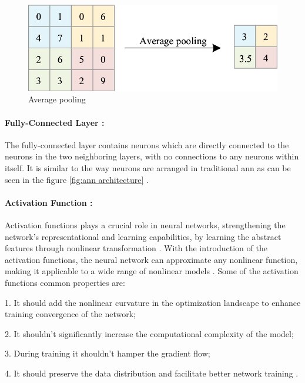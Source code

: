 \begin{figure}[H]
    \centering
    \includegraphics[width=1\linewidth]{Rohit_Master_Thesis//Images/average_pooling.png}
    \caption{Average pooling \cite{Zhao2024}}
    \label{fig:average pooling}
\end{figure}

\paragraph*{Fully-Connected Layer :}

The fully-connected layer contains neurons which are directly connected to the neurons in the two neighboring layers, with no connections to any neurons within itself. It is similar to the way neurons are arranged in traditional \gls{ann} as can be seen in the figure \ref{fig:ann architecture} \cite{oshea2015introductionconvolutionalneuralnetworks}.

\paragraph*{Activation Function :}

Activation functions plays a crucial role in neural networks, strengthening the network's representational and learning capabilities, by learning the abstract features through nonlinear transformation \cite{dubey2022activationfunctionsdeeplearning}. With the introduction of the activation functions, the neural network can approximate any nonlinear function, making it applicable to a wide range of nonlinear models \cite{Zhao2024}. Some of the activation functions common properties are:

1. It should add the nonlinear curvature in the optimization landscape to enhance training convergence of the network;

2. It shouldn't significantly increase the computational complexity of the model;

3. During training it shouldn't hamper the gradient flow;

4. It should preserve the data distribution and facilitate better network training \cite{dubey2022activationfunctionsdeeplearning}.

